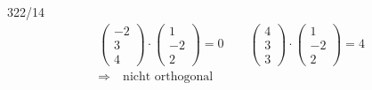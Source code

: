 \begin{exercise}{322/14}
\begin{gather*}
    \begin{pmatrix}-2 \\ 3 \\ 4\end{pmatrix} \cdot \begin{pmatrix}1 \\ -2 \\ 2\end{pmatrix} = 0 \qquad \begin{pmatrix}4 \\ 3 \\ 3\end{pmatrix} \cdot \begin{pmatrix}1 \\ -2 \\ 2\end{pmatrix} = 4 \\
    \Rightarrow\quad \text{nicht orthogonal}
  \end{gather*}
\end{exercise}
